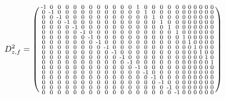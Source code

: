 \documentclass[pdftex,a4paper,parskip,listof=totoc,bibliography=totoc,onehalfspacing,12pt]{scrreprt}
\begin{document}
\begin{align*}
	D_{z,f}^2 &= \begin{psmallmatrix}
\text{-}1 & 0 & 0 & 0 & 0 & 0 & 0 & 0 & 0 & 0 & 0 & 0 & 1 & 0 & 0 & 0 & 0 & 0 & 0 & 0 & 0 & 0 & 0 & 0 \\
0 & \text{-}1 & 0 & 0 & 0 & 0 & 0 & 0 & 0 & 0 & 0 & 0 & 0 & 1 & 0 & 0 & 0 & 0 & 0 & 0 & 0 & 0 & 0 & 0 \\
0 & 0 & \text{-}1 & 0 & 0 & 0 & 0 & 0 & 0 & 0 & 0 & 0 & 0 & 0 & 1 & 0 & 0 & 0 & 0 & 0 & 0 & 0 & 0 & 0 \\
0 & 0 & 0 & \text{-}1 & 0 & 0 & 0 & 0 & 0 & 0 & 0 & 0 & 0 & 0 & 0 & 1 & 0 & 0 & 0 & 0 & 0 & 0 & 0 & 0 \\
0 & 0 & 0 & 0 & \text{-}1 & 0 & 0 & 0 & 0 & 0 & 0 & 0 & 0 & 0 & 0 & 0 & 1 & 0 & 0 & 0 & 0 & 0 & 0 & 0 \\
0 & 0 & 0 & 0 & 0 & \text{-}1 & 0 & 0 & 0 & 0 & 0 & 0 & 0 & 0 & 0 & 0 & 0 & 1 & 0 & 0 & 0 & 0 & 0 & 0 \\
0 & 0 & 0 & 0 & 0 & 0 & \text{-}1 & 0 & 0 & 0 & 0 & 0 & 0 & 0 & 0 & 0 & 0 & 0 & 1 & 0 & 0 & 0 & 0 & 0 \\
0 & 0 & 0 & 0 & 0 & 0 & 0 & \text{-}1 & 0 & 0 & 0 & 0 & 0 & 0 & 0 & 0 & 0 & 0 & 0 & 1 & 0 & 0 & 0 & 0 \\
0 & 0 & 0 & 0 & 0 & 0 & 0 & 0 & \text{-}1 & 0 & 0 & 0 & 0 & 0 & 0 & 0 & 0 & 0 & 0 & 0 & 1 & 0 & 0 & 0 \\
0 & 0 & 0 & 0 & 0 & 0 & 0 & 0 & 0 & \text{-}1 & 0 & 0 & 0 & 0 & 0 & 0 & 0 & 0 & 0 & 0 & 0 & 1 & 0 & 0 \\
0 & 0 & 0 & 0 & 0 & 0 & 0 & 0 & 0 & 0 & \text{-}1 & 0 & 0 & 0 & 0 & 0 & 0 & 0 & 0 & 0 & 0 & 0 & 1 & 0 \\
0 & 0 & 0 & 0 & 0 & 0 & 0 & 0 & 0 & 0 & 0 & \text{-}1 & 0 & 0 & 0 & 0 & 0 & 0 & 0 & 0 & 0 & 0 & 0 & 1 \\
0 & 0 & 0 & 0 & 0 & 0 & 0 & 0 & 0 & 0 & 0 & 0 & \text{-}1 & 0 & 0 & 0 & 0 & 0 & 0 & 0 & 0 & 0 & 0 & 0 \\
0 & 0 & 0 & 0 & 0 & 0 & 0 & 0 & 0 & 0 & 0 & 0 & 0 & \text{-}1 & 0 & 0 & 0 & 0 & 0 & 0 & 0 & 0 & 0 & 0 \\
0 & 0 & 0 & 0 & 0 & 0 & 0 & 0 & 0 & 0 & 0 & 0 & 0 & 0 & \text{-}1 & 0 & 0 & 0 & 0 & 0 & 0 & 0 & 0 & 0 \\
0 & 0 & 0 & 0 & 0 & 0 & 0 & 0 & 0 & 0 & 0 & 0 & 0 & 0 & 0 & \text{-}1 & 0 & 0 & 0 & 0 & 0 & 0 & 0 & 0 \\
0 & 0 & 0 & 0 & 0 & 0 & 0 & 0 & 0 & 0 & 0 & 0 & 0 & 0 & 0 & 0 & \text{-}1 & 0 & 0 & 0 & 0 & 0 & 0 & 0 \\
0 & 0 & 0 & 0 & 0 & 0 & 0 & 0 & 0 & 0 & 0 & 0 & 0 & 0 & 0 & 0 & 0 & \text{-}1 & 0 & 0 & 0 & 0 & 0 & 0 \\

\end{psmallmatrix}
\end{align*}
\end{document}
